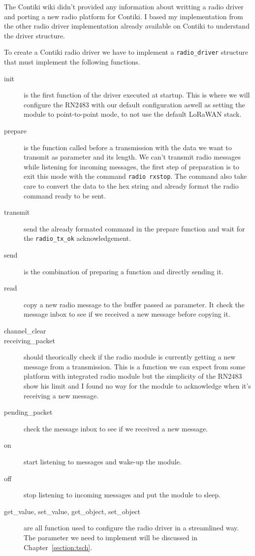 The Contiki wiki didn't provided any information about writting a radio driver
and porting a new radio platform for Contiki.
I based my implementation from the other radio driver implementation already
available on Contiki to understand the driver structure.

To create a Contiki radio driver we have to implement a \lstinline{radio_driver}
structure that must implement the following functions.

\begin{description}
  \item[init] is the first function of the driver executed at startup.
    This is where we will configure the RN2483 with our default configuration
    aswell as setting the module to point-to-point mode, to not use the default
    LoRaWAN stack.
  \item[prepare] is the function called before a transmission with the data we
    want to transmit as parameter and its length. We can't transmit radio
    messages while listening for incoming messages, the first step of
    preparation is to exit this mode with the command \lstinline{radio rxstop}.
    The command also take care to convert the data to the hex string and
    already format the radio command ready to be sent.
  \item[transmit] send the already formated command in the prepare function and
    wait for the \lstinline{radio_tx_ok} acknowledgement.
  \item[send] is the combination of preparing a function and directly sending
    it.
  \item[read] copy a new radio message to the buffer passed as parameter. It
    check the message inbox to see if we received a new message before copying
    it.
  \item[channel\_clear]
  \item[receiving\_packet] should theorically check if the radio module is
    currently getting a new message from a transmission. This is a function we
    can expect from some platform with integrated radio module but the
    simplicity of the RN2483 show his limit and I found no way for the module
    to acknowledge when it's receiving a new message.
  \item[pending\_packet] check the message inbox to see if we received a new
    message.
  \item[on] start listening to messages and wake-up the module.
  \item[off] stop listening to incoming messages and put the module to sleep.
  \item[get\_value, set\_value, get\_object, set\_object] are all function used
    to configure the radio driver in a streamlined way. The parameter we need to
    implement will be discussed in Chapter~\ref{section:tsch}.
\end{description}

